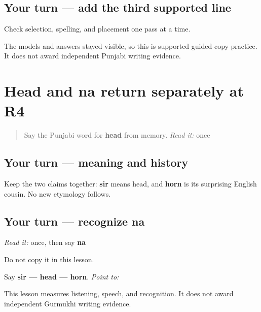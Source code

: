 \subsection*{Your turn — add the third supported line}
Check selection, spelling, and placement one pass at a time.

\begin{tcolorbox}[breakable,colback=teal!4,colframe=teal!35!black,title={Before you move on}]
The models and answers stayed visible, so this is supported guided-copy practice. It does not award independent Punjabi writing evidence.
\end{tcolorbox}
\section[Practice]{Head and na return separately at R4}

\label{lesson:PA-R28-head-na-r4}



\begin{quote}
Say the Punjabi word for \textbf{head} from memory. \emph{Read it:} \textbf{} once
\end{quote}

\subsection*{Your turn — meaning and history}
Keep the two claims together: \textbf{sir} means head, and \textbf{horn} is its surprising English cousin. No new etymology follows.

\subsection*{Your turn — recognize na}
\emph{Read it:} \textbf{} once, then say \textbf{na}

Do not copy it in this lesson.

\begin{tcolorbox}[breakable,colback=teal!4,colframe=teal!35!black,title={Before you move on}]
Say \textbf{sir — head — horn}. \emph{Point to:} \textbf{}

This lesson measures listening, speech, and recognition. It does not award independent Gurmukhi writing evidence.
\end{tcolorbox}
